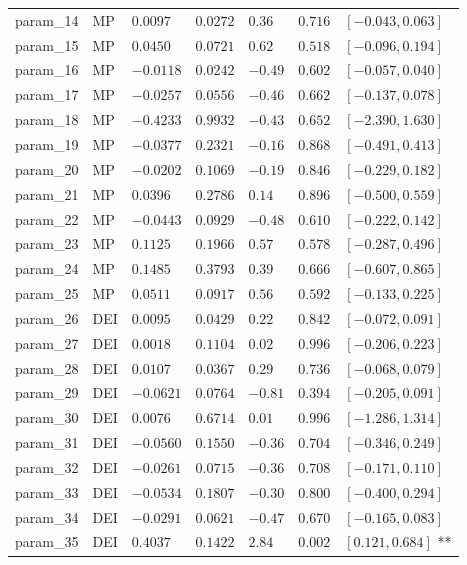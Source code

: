 \documentclass{article}
\begin{document}
\begin{longtable}{lllllll}
param\_14 & MP & $0.0097$ & $0.0272$ & $0.36$ & $0.716$ & $[-0.043, 0.063]$  \\
param\_15 & MP & $0.0450$ & $0.0721$ & $0.62$ & $0.518$ & $[-0.096, 0.194]$  \\
param\_16 & MP & $-0.0118$ & $0.0242$ & $-0.49$ & $0.602$ & $[-0.057, 0.040]$  \\
param\_17 & MP & $-0.0257$ & $0.0556$ & $-0.46$ & $0.662$ & $[-0.137, 0.078]$  \\
param\_18 & MP & $-0.4233$ & $0.9932$ & $-0.43$ & $0.652$ & $[-2.390, 1.630]$  \\
param\_19 & MP & $-0.0377$ & $0.2321$ & $-0.16$ & $0.868$ & $[-0.491, 0.413]$  \\
param\_20 & MP & $-0.0202$ & $0.1069$ & $-0.19$ & $0.846$ & $[-0.229, 0.182]$  \\
param\_21 & MP & $0.0396$ & $0.2786$ & $0.14$ & $0.896$ & $[-0.500, 0.559]$  \\
param\_22 & MP & $-0.0443$ & $0.0929$ & $-0.48$ & $0.610$ & $[-0.222, 0.142]$  \\
param\_23 & MP & $0.1125$ & $0.1966$ & $0.57$ & $0.578$ & $[-0.287, 0.496]$  \\
param\_24 & MP & $0.1485$ & $0.3793$ & $0.39$ & $0.666$ & $[-0.607, 0.865]$  \\
param\_25 & MP & $0.0511$ & $0.0917$ & $0.56$ & $0.592$ & $[-0.133, 0.225]$  \\
param\_26 & DEI & $0.0095$ & $0.0429$ & $0.22$ & $0.842$ & $[-0.072, 0.091]$  \\
param\_27 & DEI & $0.0018$ & $0.1104$ & $0.02$ & $0.996$ & $[-0.206, 0.223]$  \\
param\_28 & DEI & $0.0107$ & $0.0367$ & $0.29$ & $0.736$ & $[-0.068, 0.079]$  \\
param\_29 & DEI & $-0.0621$ & $0.0764$ & $-0.81$ & $0.394$ & $[-0.205, 0.091]$  \\
param\_30 & DEI & $0.0076$ & $0.6714$ & $0.01$ & $0.996$ & $[-1.286, 1.314]$  \\
param\_31 & DEI & $-0.0560$ & $0.1550$ & $-0.36$ & $0.704$ & $[-0.346, 0.249]$  \\
param\_32 & DEI & $-0.0261$ & $0.0715$ & $-0.36$ & $0.708$ & $[-0.171, 0.110]$  \\
param\_33 & DEI & $-0.0534$ & $0.1807$ & $-0.30$ & $0.800$ & $[-0.400, 0.294]$  \\
param\_34 & DEI & $-0.0291$ & $0.0621$ & $-0.47$ & $0.670$ & $[-0.165, 0.083]$  \\
param\_35 & DEI & $0.4037$ & $0.1422$ & $2.84$ & $0.002$ & $[0.121, 0.684]$ ** \\

\end{longtable}
\end{document}
